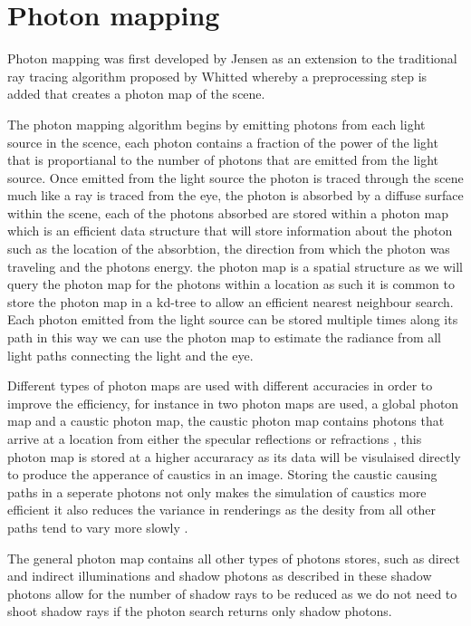 \section{Photon mapping}
Photon mapping was first developed by Jensen \cite{Jensen95b} as an extension to the traditional ray
tracing algorithm proposed by Whitted \cite{whitted79a} whereby a preprocessing step is added that
creates a photon map of the scene.

The photon mapping algorithm begins by emitting photons from each light source in the scence,
each photon contains a fraction of the power of the light that is proportianal to the number
of photons that are emitted from the light source. Once emitted from the light source the
photon is traced through the scene much like a ray is traced from the eye, 
the photon is absorbed by a diffuse surface within the scene, each of the photons absorbed are stored within a photon map
which is an efficient data structure that will store information about the photon such as the
location of the absorbtion, the direction from which the photon was traveling and the photons
energy. the photon map is a spatial structure as we will query the photon map for the photons
within a location as such it is common to store the photon map in a kd-tree to allow an efficient
nearest neighbour search. Each photon emitted from the light source can be stored multiple times
along its path in this way we can use the photon map to estimate the radiance from all light
paths connecting the light and the eye.

Different types of photon maps are used with different accuracies in order to
improve the efficiency, for instance in \cite{Jensen96a} two photon maps are used, a global photon
map and a caustic photon map, the caustic photon map contains photons that arrive at a location from
either the specular reflections or refractions , this photon map is stored at a higher
accuraracy as its data will be visulaised directly to produce the apperance of caustics in an image.
Storing the caustic causing paths in a seperate photons not only makes the simulation of caustics
more efficient it also reduces the variance in renderings as the desity from all other paths
tend to vary more slowly \cite{JensenBook}.

The general photon map contains all other types of photons stores, such as direct and indirect
illuminations and shadow photons as described in \cite{Jensen95c, Jensen96a} these shadow photons
allow for the number of shadow rays to be reduced as we do not need to shoot shadow rays if the
photon search returns only shadow photons.

